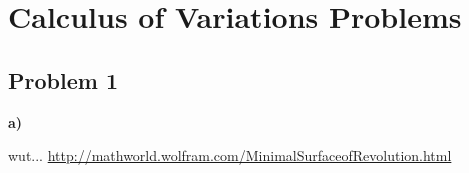 \section{Calculus of Variations Problems}

\subsection{Problem 1}

\textbf{a)}

\answer

wut...
\url{http://mathworld.wolfram.com/MinimalSurfaceofRevolution.html}